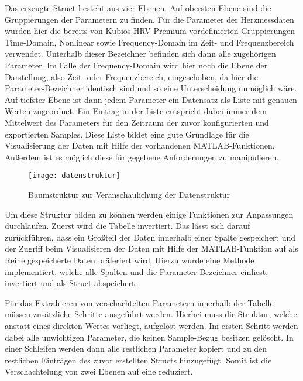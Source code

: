 Das erzeugte Struct besteht aus vier Ebenen. Auf obersten Ebene sind die Gruppierungen der Parametern zu finden. Für die Parameter der Herzmessdaten wurden hier die bereits von Kubios HRV Premium vordefinierten Gruppierungen Time-Domain, Nonlinear sowie Frequency-Domain im Zeit- und Frequenzbereich verwendet. Unterhalb dieser Bezeichner befinden sich dann alle zugehörigen Parameter. Im Falle der Frequency-Domain wird hier noch die Ebene der Darstellung, also Zeit- oder Frequenzbereich, eingeschoben, da hier die Parameter-Bezeichner identisch sind und so eine Unterscheidung unmöglich wäre. Auf tiefster Ebene ist dann jedem Parameter ein Datensatz als Liste mit genauen Werten zugeordnet. Ein Eintrag in der Liste entspricht dabei immer dem Mittelwert des Parameters für den Zeitraum der zuvor konfigurierten und exportierten Samples. Diese Liste bildet eine gute Grundlage für die Visualisierung der Daten mit Hilfe der vorhandenen MATLAB-Funktionen. Außerdem ist es möglich diese für gegebene Anforderungen zu manipulieren.

\begin{figure}[H]
	\centering
	\texttt{[image: datenstruktur]}
	\caption{Baumstruktur zur Veranschaulichung der Datenstruktur}
	\label{fig:datenstruktur}
\end{figure}

Um diese Struktur bilden zu können werden einige Funktionen zur Anpassungen durchlaufen. Zuerst wird die Tabelle invertiert. Das lässt sich darauf zurückführen, dass ein Großteil der Daten innerhalb einer Spalte gespeichert und der Zugriff beim Visualisieren der Daten mit Hilfe der MATLAB-Funktion auf als Reihe gespeicherte Daten präferiert wird. Hierzu wurde eine Methode implementiert, welche alle Spalten und die Parameter-Bezeichner einliest, invertiert und als Struct abspeichert.



Für das Extrahieren von verschachtelten Parametern innerhalb der Tabelle müssen zusätzliche Schritte ausgeführt werden. Hierbei muss die Struktur, welche anstatt eines direkten Wertes vorliegt, aufgelöst werden. Im ersten Schritt werden dabei alle unwichtigen Parameter, die keinen Sample-Bezug besitzen gelöscht. In einer Schleifen werden dann alle restlichen Parameter kopiert und zu den restlichen Einträgen des zuvor erstellten Structs hinzugefügt. Somit ist die Verschachtelung von zwei Ebenen auf eine reduziert.

